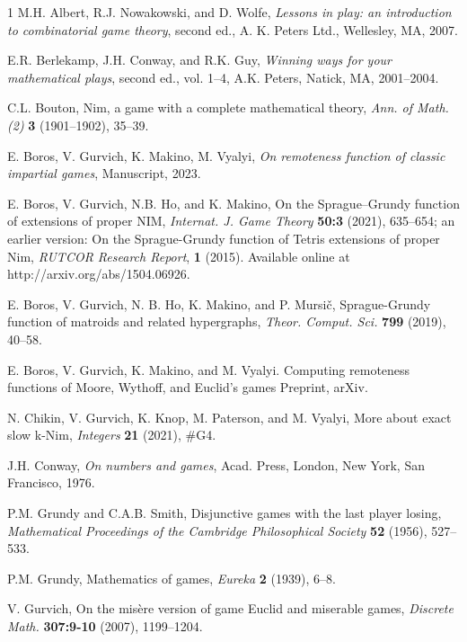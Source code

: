 \documentclass[10pt]{article}
\theoremstyle{definition}
\begin{document}
\begin{thebibliography}{1}\footnotesize  
{}
M.H. Albert, R.J. Nowakowski, and D. Wolfe,
{\it Lessons in play: an introduction to combinatorial game theory},
second ed., A. K. Peters Ltd., Wellesley, MA, 2007.

E.R. Berlekamp, J.H. Conway, and R.K. Guy, 
{\it Winning ways for your mathematical plays}, second ed., vol. 1–4, 
A.K. Peters, Natick, MA, 2001--2004.

C.L. Bouton, Nim, a game with a complete mathematical theory,
{\it Ann. of Math. (2)}  {\bf3} (1901--1902), 35--39.

E. Boros, V. Gurvich, K. Makino, M. Vyalyi, 
{\it On remoteness function of classic impartial games}, 
Manuscript, 2023. 

E. Boros, V. Gurvich, N.B. Ho, and K. Makino,
On the Sprague--Grundy function of extensions of proper NIM,
{\it Internat. J. Game Theory} {\bf 50:3} (2021), 635--654;
an earlier version: 
On the Sprague-Grundy function of Tetris extensions of proper {\sc Nim},
{\it RUTCOR Research Report}, {\bf 1} (2015).  Available online at
http://arxiv.org/abs/1504.06926. 

E. Boros, V. Gurvich, N. B. Ho, K. Makino, and  P. Mursi\v{c}, 
Sprague-Grundy function of matroids and related hypergraphs, 
{\it Theor. Comput. Sci.} {\bf799} (2019), 40--58. 

E. Boros, V. Gurvich, K. Makino, and M. Vyalyi.
Computing remoteness functions 
of Moore, Wythoff, and Euclid's games
Preprint, arXiv.

N. Chikin, V. Gurvich, K. Knop, M. Paterson, 
and M. Vyalyi, 
More about exact slow k-Nim, 
{\it Integers} {\bf 21} (2021), \#G4.   

J.H. Conway, {\it On numbers and games}, Acad. Press, 
London, New York, San Francisco, 1976.

P.M. Grundy and C.A.B. Smith, 
Disjunctive games with the last player losing, 
{\it Mathematical Proceedings of 
the Cambridge Philosophical Society} {\bf52} (1956), 527--533.

P.M. Grundy, Mathematics of games, {\it Eureka} {\bf2} (1939), 6--8.

V. Gurvich, 
On the mis\`{e}re version of game Euclid and miserable games, 
{\it Discrete Math.} {\bf 307:9-10} (2007), 1199--1204.


\end{thebibliography}
\end{document}
